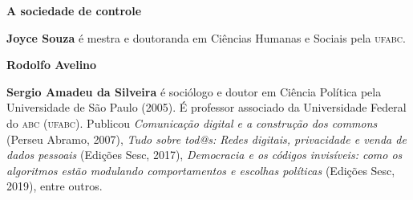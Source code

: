 \textbf{A sociedade de controle} \lipsum[1]

\textbf{Joyce Souza} é mestra e doutoranda em Ciências Humanas e Sociais pela \textsc{ufabc}.

\textbf{Rodolfo Avelino} \lipsum[3]

\textbf{Sergio Amadeu da Silveira} é sociólogo e doutor em Ciência Política pela Universidade de São Paulo (2005). É professor associado da Universidade Federal do \textsc{abc} (\textsc{ufabc}). Publicou \textit{Comunicação digital e a construção dos commons} (Perseu Abramo, 2007), \textit{Tudo sobre tod@s: Redes digitais, privacidade e venda de dados pessoais} (Edições Sesc, 2017), \textit{Democracia e os códigos invisíveis: como os algoritmos estão modulando comportamentos e escolhas políticas} (Edições Sesc, 2019), entre outros.

